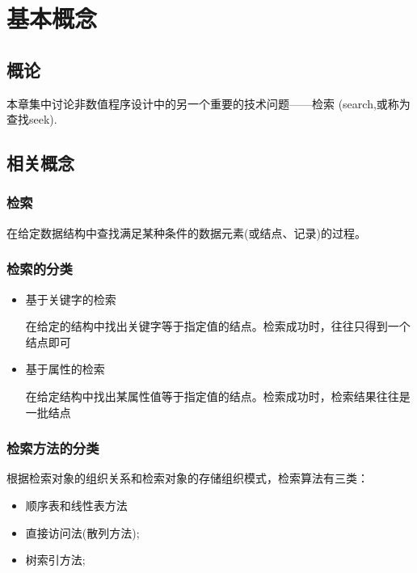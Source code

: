 \documentclass[AutoFakeBold]{LZUThesis2007}
\begin{document}
	\section{基本概念}
		\subsection{概论}
本章集中讨论非数值程序设计中的另一个重要的技术问题——检索 (search,或称为查找seek).
		\subsection{相关概念}
			\subsubsection{检索}
在给定数据结构中查找满足某种条件的数据元素(或结点、记录)的过程。

			\subsubsection{检索的分类}
\begin{itemize}
	\item 基于关键字的检索

在给定的结构中找出关键字等于指定值的结点。检索成功时，往往只得到一个结点即可
	\item 基于属性的检索

在给定结构中找出某属性值等于指定值的结点。检索成功时，检索结果往往是一批结点

\end{itemize}

			\subsubsection{检索方法的分类}
根据检索对象的组织关系和检索对象的存储组织模式，检索算法有三类：
\begin{itemize}
	\item 顺序表和线性表方法
	\item 直接访问法(散列方法);
	\item 树索引方法;


\end{itemize}
\end{document}
